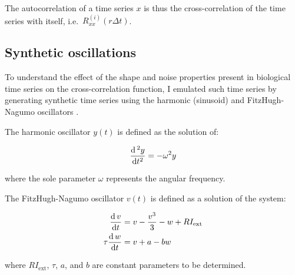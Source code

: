 The autocorrelation of a time series $x$ is thus the cross-correlation of the time series with itself, i.e.\ $R_{xx}^{(i)}(r \Delta t)$.


\subsection{Synthetic oscillations}
\label{subsec:methods-computational-synthetic}

To understand the effect of the shape and noise properties present in biological time series on the cross-correlation function, I emulated such time series by generating synthetic time series using the harmonic (sinusoid) and FitzHugh-Nagumo oscillators \parencite{fitzhughImpulsesPhysiologicalStates1961}.

The harmonic oscillator $y(t)$ is defined as the solution of:

\begin{equation}
  \frac{\mathrm{d} \,^{2} y}{\mathrm{d} t^{2}} = -\omega^{2}y
  \label{eq:harmonic}
\end{equation}

where the sole parameter $\omega$ represents the angular frequency.



The FitzHugh-Nagumo oscillator $v(t)$ is defined as a solution of the system:

\begin{equation}
  \begin{aligned}
    \frac{\mathrm{d} \, v}{\mathrm{d} t} &= v - \frac{v^3}{3} - w + RI_{\mathrm{ext}} \\
    \tau \frac{\mathrm{d} \, w}{\mathrm{d} t} &= v + a - bw
  \end{aligned}
  \label{eq:fhn}
\end{equation}

where $RI_{\mathrm{ext}}$, $\tau$, $a$, and $b$ are constant parameters to be determined.

